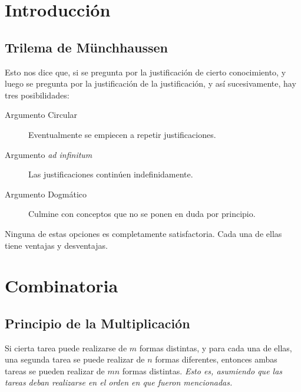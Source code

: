 \label{CLASE 2}

\section{Introducción}

\subsection{Trilema de Münchhaussen}

Esto nos dice que, si se pregunta por la justificación de cierto conocimiento, y luego se pregunta por la justificación de la justificación, y así sucesivamente, hay tres posibilidades:

\begin{description}
	\item[Argumento Circular] Eventualmente se empiecen a repetir justificaciones.
	\item[Argumento \textit{ad infinitum}] Las justificaciones continúen indefinidamente.
	\item[Argumento Dogmático] Culmine con conceptos que no se ponen en duda por principio.
\end{description}

Ninguna de estas opciones es completamente satisfactoria.  Cada una de ellas tiene ventajas y desventajas.

\section{Combinatoria}
\subsection{Principio de la Multiplicación}

Si cierta tarea puede realizarse de $m$ formas distintas, y para cada una de ellas, una segunda tarea se puede realizar de $n$ formas diferentes, entonces ambas tareas se pueden realizar de $mn$ formas distintas.  \textit{Esto es, asumiendo que las tareas deban realizarse en el orden en que fueron mencionadas.}